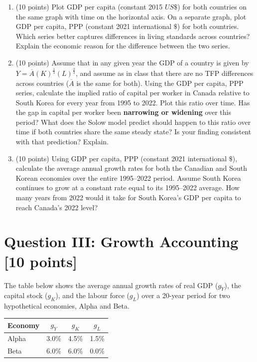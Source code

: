 \documentclass[letterpaper,12pt]{article}
\theoremstyle{dotlessS}
\begin{document}
\begin{enumerate}[label=(\alph*)]
\item (10 points) Plot GDP per capita (constant 2015 $US\$$) for both countries on the same graph with time on the horizontal axis. On a separate graph, plot GDP per capita, PPP (constant 2021 international $\$$) for both countries. Which series better captures differences in living standards across countries? Explain the economic reason for the difference between the two series.

\item (10 points) Assume that in any given year the GDP of a country is given by $Y=\overline{A}(K)^{\frac{1}{3}}(L)^{\frac{2}{3}}$, and assume as in class that there are no TFP differences across countries ($\overline{A}$ is the same for both). Using the GDP per capita, PPP series, calculate the implied ratio of capital per worker in Canada relative to South Korea for every year from 1995 to 2022. Plot this ratio over time. Has the gap in capital per worker been \textbf{narrowing or widening} over this period? What does the Solow model predict should happen to this ratio over time if both countries share the same steady state? Is your finding consistent with that prediction? Explain.

\item (10 points) Using GDP per capita, PPP (constant 2021 international $\$$), calculate the average annual growth rates for both the Canadian and South Korean economies over the entire 1995--2022 period. Assume South Korea continues to grow at a constant rate equal to its 1995--2022 average. How many years from 2022 would it take for South Korea's GDP per capita to reach Canada's 2022 level?
\end{enumerate}


\section*{Question III: Growth Accounting [10 points]}
The table below shows the average annual growth rates of real GDP ($g_Y$), the capital stock ($g_K$), and the labour force ($g_L$) over a 20-year period for two hypothetical economies, Alpha and Beta.

\vspace{0.5em}
\begin{table}[H]
\centering
\begin{tabular}{lccc}
\toprule
\textbf{Economy} & $g_Y$ & $g_K$ & $g_L$ \\
\midrule
Alpha & 3.0\% & 4.5\% & 1.5\% \\
Beta  & 6.0\% & 6.0\% & 0.0\% \\
\bottomrule
\end{tabular}
\end{table}
\end{document}
